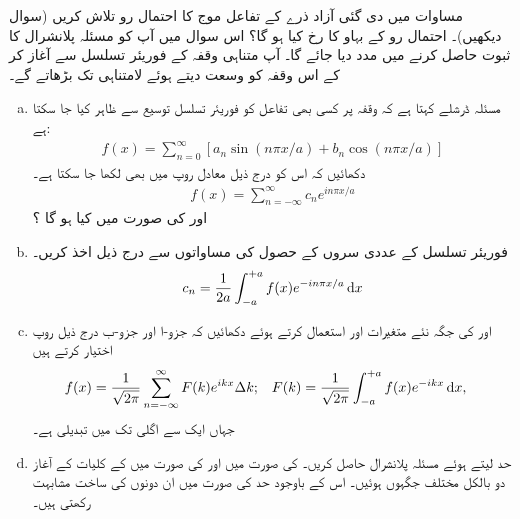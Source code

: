 مساوات  میں دی گئی آزاد ذرے کے تفاعل موج کا احتمال رو  تلاش کریں (سوال  دیکھیں)۔ احتمال رو کے بہاو کا رخ کیا ہو گا؟
اس سوال میں آپ کو مسئلہ پلانشرال کا ثبوت حاصل کرنے میں مدد دیا جائے گا۔ آپ متناہی وقفہ کے فوریئر تسلسل سے آغاز کر کے اس وقفہ کو وسعت دیتے ہوئے لامتناہی تک بڑھاتے گے۔ 

\begin{enumerate}[a. ]
\item 
مسئلہ ڈرشلے کہتا ہے کہ وقفہ  پر کسی بھی تفاعل  کو فوریئر تسلسل  توسیع  سے ظاہر کیا جا سکتا ہے:
\begin{align*}
f(x) = \sum_{n=0}^{\infty} [ a_{n}\sin( n\pi x/a ) + b_{n}\cos( n\pi x/a )]
\end{align*}
دکھائیں کہ اس کو درج ذیل معادل روپ میں بھی لکھا جا سکتا ہے۔
\begin{align*}
f(x) = \sum_{n=-\infty}^{\infty} c_{n}e^{i n \pi x /a }
\end{align*}
 اور  کی صورت میں  کیا ہو گا ؟
 \item
 فوریئر تسلسل کے عددی سروں کے حصول کی مساواتوں سے درج ذیل اخذ کریں۔
\begin{align*}
c_{n} = \frac{1}{2a} \int_{-a}^{+a} f(x)e^{-in\pi x/a} \dif x
\end{align*}
\item
{} اور  کی جگہ نئے متغیرات  اور 
  استعمال کرتے ہوئے دکھائیں کہ جزو-ا اور جزو-ب درج ذیل روپ اختیار کرتے ہیں 
\begin{align*}
f(x) &= \frac{1}{\sqrt{2 \pi }} \sum_{n=-\infty}^{\infty} F(k)e^{ikx} \Delta k; && F(k) = \frac{1}{\sqrt{2\pi}} \int_{-a}^{+a} f(x) e^{-ikx} \dif x,
\end{align*}
جہاں ایک  سے اگلی  تک  میں تبدیلی  ہے۔ 
\item
حد  لیتے ہوئے مسئلہ پلانشرال حاصل کریں۔   کی صورت میں  اور  کی صورت میں  کے کلیات کے آغاز دو بالکل مختلف جگہوں ہوئیں۔ اس کے باوجود حد  کی صورت میں ان دونوں کی ساخت   مشابہت رکھتی ہیں۔ 
\end{enumerate}

